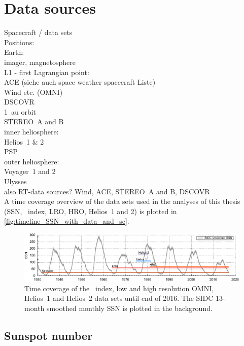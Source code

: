 \section{Data sources}

Spacecraft / data sets\\

Positions:\\
Earth:\\
	imager, magnetosphere\\
L1 - first Lagrangian point:\\
	ACE (siehe auch space weather spacecraft Liste)\\
	Wind etc. (OMNI)\\
	DSCOVR\\
1~au orbit\\
	STEREO~A and B\\
inner heliosphere:\\
	Helios~1 \& 2\\
	PSP\\
outer heliosphere:\\
	Voyager~1 and 2\\
	Ulysses\\

also RT-data sources? Wind, ACE, STEREO~A and B, DSCOVR\\

A time coverage overview of the data sets used in the analyses of this thesis (SSN, \Kp~index, LRO, HRO, Helios~1 and 2) is plotted in \autoref{fig:timeline_SSN_with_data_and_sc}.\\
\begin{figure}[htb]
	\centering
	\includegraphics[width=\textwidth]{images/gnuplots/timeline_SSN_with_data_and_sc.pdf}
	\caption{Time coverage of the \Kp~index, low and high resolution OMNI, Helios~1 and Helios~2 data sets until end of 2016. The SIDC 13-month smoothed monthly SSN is plotted in the background.}
	\label{fig:timeline_SSN_with_data_and_sc}
\end{figure}


\subsection{Sunspot number}

